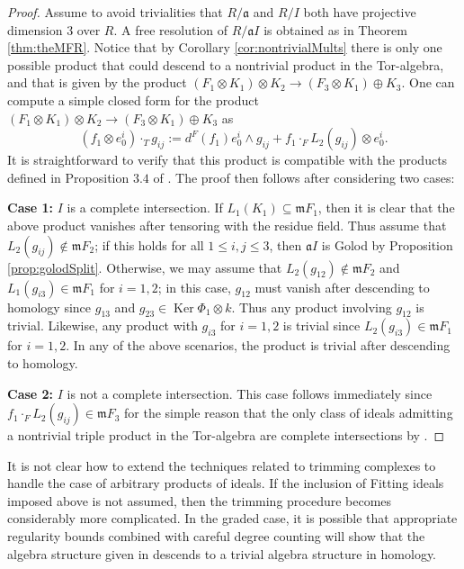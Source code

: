 \documentclass[10pt]{amsart}
\theoremstyle{definition}
\theoremstyle{remark}
\newtheorem{the context}[theorem]{The Context}
\numberwithin{equation}{theorem}
\numberwithin{equation}{section}
\newcommand{\Ker}{\operatorname{Ker}}
\newcommand{\ideal}[1]{\mathfrak{#1}}
\newcommand{\m}{\ideal{m}}
\renewcommand{\leq}{\leqslant}
\renewcommand{\ker}{\Ker}
\newcommand{\mfa}{\mathfrak{a}}
\def\w{\wedge}
\begin{document}
\begin{proof}
Assume to avoid trivialities that $R / \mfa$ and $R / I$ both have projective dimension $3$ over $R$. A free resolution of $R/ \mfa I$ is obtained as in Theorem \ref{thm:theMFR}. Notice that by Corollary \ref{cor:nontrivialMults} there is only one possible product that could descend to a nontrivial product in the Tor-algebra, and that is given by the product $(F_1 \otimes K_1) \otimes K_2 \to (F_3 \otimes K_1) \oplus K_3$. One can compute a simple closed form for the product $(F_1 \otimes K_1) \otimes K_2 \to (F_3 \otimes K_1) \oplus K_3$ as
$$(f_1 \otimes e_0^i) \cdot_T g_{ij} := d^F (f_1) e_0^i \w g_{ij} + f_1 \cdot_F L_2( g_{ij} ) \otimes e_0^i.$$
It is straightforward to verify that this product is compatible with the products defined in Proposition $3.4$ of \cite{vandebogert2020dg}. The proof then follows after considering two cases:

\textbf{Case 1:} $I$ is a complete intersection. If $L_1 (K_1) \subseteq \m F_1$, then it is clear that the above product vanishes after tensoring with the residue field. Thus assume that $L_2 (g_{ij}) \notin \m F_2$; if this holds for all $1 \leq i , j \leq 3$, then $\mfa I$ is Golod by Proposition \ref{prop:golodSplit}. Otherwise, we may assume that $L_2 (g_{12} ) \notin \m F_2$ and $L_1 (g_{i3}) \in \m F_1$ for $i=1,2$; in this case, $g_{12}$ must vanish after descending to homology since $g_{13}$ and $g_{23} \in \ker \Phi_1 \otimes k$. Thus any product involving $g_{12}$ is trivial. Likewise, any product with $g_{i3}$ for $i=1,2$ is trivial since $L_2 (g_{i3}) \in \m F_1$ for $i=1,2$. In any of the above scenarios, the product is trivial after descending to homology.

\textbf{Case 2:} $I$ is not a complete intersection. This case follows immediately since $f_1 \cdot_F L_2( g_{ij}) \in \m F_3$ for the simple reason that the only class of ideals admitting a nontrivial triple product in the Tor-algebra are complete intersections by \cite[Theorem 2.1]{avramov1988poincare}.
\end{proof}

It is not clear how to extend the techniques related to trimming complexes to handle the case of arbitrary products of ideals. If the inclusion of Fitting ideals imposed above is not assumed, then the trimming procedure becomes considerably more complicated. In the graded case, it is possible that appropriate regularity bounds combined with careful degree counting will show that the algebra structure given in \cite{vandebogert2020dg} descends to a trivial algebra structure in homology. 
\end{document}

